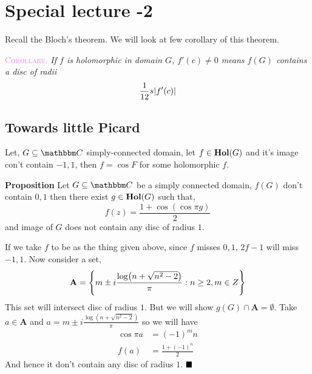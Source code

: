 \documentclass[../ComplexAnalysis_Notes.tex]{subfiles}
\begin{document}
\chapter*{Special lecture -2} %
\setcounter{chapter}{14} %
\setcounter{section}{0}
\setcounter{equation}{0}
\setcounter{figure}{0}

Recall the Bloch's theorem. We will look at few corollary of this theorem.

\vspace*{0.2cm}

\hspace*{0.6cm} \textcolor{violet}{\textsc{Corollary}.} \textit{If $f$ is holomorphic in domain $G$, $f'(c)\neq 0$ means $f(G)$ contains a disc of radii $$\frac{1}{12}s\abs{f'(c)}$$}

\section*{Towards little Picard}

\begin{Lem}{}{}
    Let, $G \subseteq \C$ simply-connected domain, let $f \in \operatorname{\mathbf{Hol}}(G)$ and it's image con't contain $-1,1$, then $f = \cos F$ for some holomorphic $f$.
\end{Lem}

\textbf{Proposition} Let $G \subseteq \C$ be a simply connected domain, $f(G)$ don't contain $0,1$ then there exist $g \in \operatorname{\mathbf{Hol}}(G)$ such that, $$f(z)= \frac{1+\cos(\cos \pi g)}{2}$$ and image of $G$ does not contain any disc of radius $1$.
    
\vspace*{0.2cm}

\noindent If we take $f$ to be as the thing given above, since $f$ misses $0,1$, $2f-1$ will miss $-1,1$. Now consider a set, $$\mathbf{A} = \qty{m \pm i \frac{\log (n + \sqrt{n^2-2})}{\pi} : n \geq 2, m \in Z}$$ This set will intersect disc of radius $1$. But we will show $g(G) \cap \mathbf{A}= \emptyset$. Take $a \in \mathbf{A}$ and $a = m \pm i \frac{\log (n + \sqrt{n^2-2})}{\pi}$ so we will have \begin{align*}
    \cos \pi a &= (-1)^m n\\
    f(a) &= \frac{1+(-1)^n}{2}
\end{align*} And hence it don't contain any disc of radius $1$. $\hfill \blacksquare$

\vspace*{0.2cm}
\end{document}
